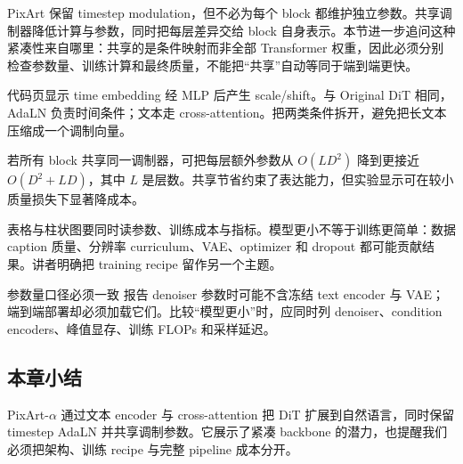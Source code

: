 PixArt 保留 timestep modulation，但不必为每个 block 都维护独立参数。共享调制器降低计算与参数，同时把每层差异交给 block 自身表示。本节进一步追问这种紧凑性来自哪里：共享的是条件映射而非全部 Transformer 权重，因此必须分别检查参数量、训练计算和最终质量，不能把“共享”自动等同于端到端更快。


代码页显示 time embedding 经 MLP 后产生 scale/shift。与 Original DiT 相同，AdaLN 负责时间条件；文本走 cross-attention。把两类条件拆开，避免把长文本压缩成一个调制向量。


若所有 block 共享同一调制器，可把每层额外参数从 $O(LD^2)$ 降到更接近 $O(D^2+LD)$，其中 $L$ 是层数。共享节省约束了表达能力，但实验显示可在较小质量损失下显著降成本。


表格与柱状图要同时读参数、训练成本与指标。模型更小不等于训练更简单：数据 caption 质量、分辨率 curriculum、VAE、optimizer 和 dropout 都可能贡献结果。讲者明确把 training recipe 留作另一个主题。


\begin{warningbox}{参数量口径必须一致}
报告 denoiser 参数时可能不含冻结 text encoder 与 VAE；端到端部署却必须加载它们。比较“模型更小”时，应同时列 denoiser、condition encoders、峰值显存、训练 FLOPs 和采样延迟。
\end{warningbox}

\subsection{本章小结}

PixArt-$\alpha$ 通过文本 encoder 与 cross-attention 把 DiT 扩展到自然语言，同时保留 timestep AdaLN 并共享调制参数。它展示了紧凑 backbone 的潜力，也提醒我们必须把架构、训练 recipe 与完整 pipeline 成本分开。

